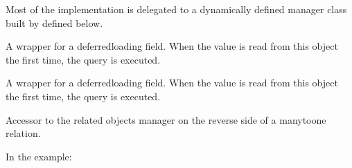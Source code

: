 \documentclass[letterpaper,10pt,english]{sphinxmanual}
\begin{document}
\begin{fulllineitems}
\begin{fulllineitems}
Most of the implementation is delegated to a dynamically defined manager
class built by  defined below.

\end{fulllineitems}


\begin{fulllineitems}
\label{\detokenize{accounts:accounts.models.User.headline}}
A wrapper for a deferred\sphinxhyphen{}loading field. When the value is read from this
object the first time, the query is executed.

\end{fulllineitems}


\begin{fulllineitems}
\label{\detokenize{accounts:accounts.models.User.id}}
A wrapper for a deferred\sphinxhyphen{}loading field. When the value is read from this
object the first time, the query is executed.

\end{fulllineitems}


\begin{fulllineitems}
\label{\detokenize{accounts:accounts.models.User.inappnotification_set}}
Accessor to the related objects manager on the reverse side of a
many\sphinxhyphen{}to\sphinxhyphen{}one relation.

In the example:

\begin{sphinxVerbatim}[commandchars=\\\{\}]
 
       
\end{sphinxVerbatim}


\end{fulllineitems}
\end{fulllineitems}
\end{document}
